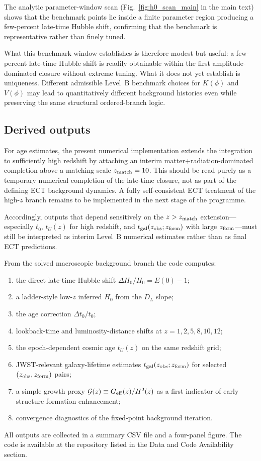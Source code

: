 \documentclass[11pt,a4paper]{article}
\numberwithin{equation}{section}
\begin{document}
The analytic parameter-window scan (Fig.~\ref{fig:h0_scan_main} in the
main text) shows that the benchmark points lie inside a finite parameter
region producing a few-percent late-time Hubble shift, confirming that
the benchmark is representative rather than finely tuned.

What this benchmark window establishes is therefore modest but useful:
a few-percent late-time Hubble shift is readily obtainable within the
first amplitude-dominated closure without extreme tuning.
What it does not yet establish is uniqueness.
Different admissible Level~B benchmark choices for $K(\phi)$ and
$V(\phi)$ may lead to quantitatively different background histories even
while preserving the same structural ordered-branch logic.

\subsection{Derived outputs}

For age estimates, the present numerical implementation extends the
integration to sufficiently high redshift by attaching an interim
matter+radiation-dominated completion above a matching scale
$z_{\rm match}=10$.
This should be read purely as a temporary numerical completion of the
late-time closure, not as part of the defining ECT background dynamics.
A fully self-consistent ECT treatment of the high-$z$ branch remains to
be implemented in the next stage of the programme.

Accordingly, outputs that depend sensitively on the $z>z_{\rm match}$
extension---especially $t_0$, $t_U(z)$ for high redshift, and
$t_{\rm gal}(z_{\rm obs};z_{\rm form})$ with large $z_{\rm form}$---must
still be interpreted as interim Level~B numerical estimates rather than
as final ECT predictions.

From the solved macroscopic background branch the code computes:
\begin{enumerate}
\item the direct late-time Hubble shift $\Delta H_0/H_0 = E(0)-1$;
\item a ladder-style low-$z$ inferred $H_0$ from the $D_L$ slope;
\item the age correction $\Delta t_0/t_0$;
\item lookback-time and luminosity-distance shifts at $z=1,2,5,8,10,12$;
\item the epoch-dependent cosmic age $t_U(z)$ on the same redshift grid;
\item JWST-relevant galaxy-lifetime estimates
$t_{\rm gal}(z_{\rm obs};z_{\rm form})$ for selected
$(z_{\rm obs},z_{\rm form})$ pairs;
\item a simple growth proxy
$\mathcal{G}(z)\equiv G_{\rm eff}(z)/H^2(z)$
as a first indicator of early structure formation enhancement;
\item convergence diagnostics of the fixed-point background iteration.
\end{enumerate}
All outputs are collected in a summary CSV file and a four-panel figure.
The code is available at the repository listed in the Data and Code
Availability section.
\end{document}
